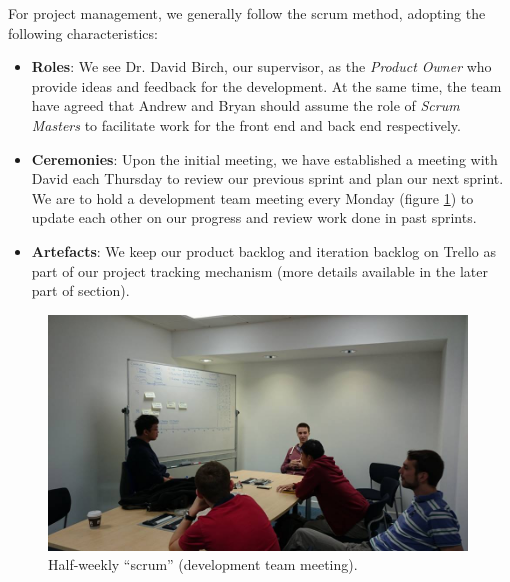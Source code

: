 \documentclass[a4paper]{article}
\begin{document}
For project management, we generally follow the scrum method, adopting the
following characteristics:
\begin{itemize}
  \item \textbf{Roles}: We see Dr. David Birch, our supervisor, as the \textit{Product Owner}
        who provide ideas and feedback for the development. At the same time,
        the team have agreed that Andrew and Bryan should assume the role of
        \textit{Scrum Masters} to facilitate work for the front end and back end respectively.
  \item \textbf{Ceremonies}: Upon the initial meeting, we have established a
        meeting with David each Thursday to review our previous sprint 
        and plan our next sprint. We are to hold a development team
        meeting every Monday (figure \ref{fig:scrum}) to update each other 
        on our progress and review work done in past sprints.
  \item \textbf{Artefacts}: We keep our product backlog and iteration backlog on
        Trello as part of our project tracking mechanism (more details
        available in the later part of section).
\end{itemize}


\begin{figure}[ht]
  \centering
    \includegraphics[width = 0.99\textwidth]{./planning/scrum.jpg}
   
  \caption{Half-weekly ``scrum'' (development team meeting).}
  \label{fig:scrum}
\end{figure}
\end{document}
